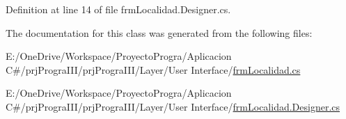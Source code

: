 Definition at line 14 of file frm\+Localidad.\+Designer.\+cs.



The documentation for this class was generated from the following files\+:\begin{DoxyCompactItemize}
\item 
E\+:/\+One\+Drive/\+Workspace/\+Proyecto\+Progra/\+Aplicacion C\#/prj\+Progra\+I\+I\+I/prj\+Progra\+I\+I\+I/\+Layer/\+User Interface/\hyperlink{frm_localidad_8cs}{frm\+Localidad.\+cs}\item 
E\+:/\+One\+Drive/\+Workspace/\+Proyecto\+Progra/\+Aplicacion C\#/prj\+Progra\+I\+I\+I/prj\+Progra\+I\+I\+I/\+Layer/\+User Interface/\hyperlink{frm_localidad_8_designer_8cs}{frm\+Localidad.\+Designer.\+cs}\end{DoxyCompactItemize}

